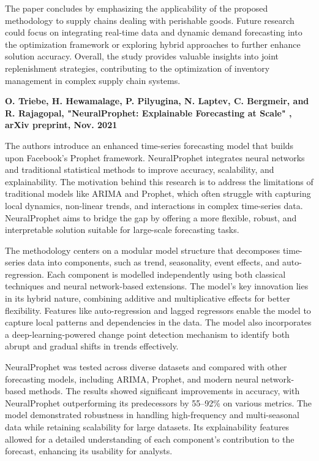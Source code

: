 The paper concludes by emphasizing the applicability of the proposed methodology to supply chains dealing with perishable goods. Future research could focus on integrating real-time data and dynamic demand forecasting into the optimization framework or exploring hybrid approaches to further enhance solution accuracy. Overall, the study provides valuable insights into joint replenishment strategies, contributing to the optimization of inventory management in complex supply chain systems.

\textbf{\cite{triebe2021neuralprophet}O. Triebe, H. Hewamalage, P. Pilyugina, N. Laptev, C. Bergmeir, and R. Rajagopal, "NeuralProphet: Explainable Forecasting at Scale" , arXiv preprint, Nov. 2021}


The authors introduce an enhanced time-series forecasting model that builds upon Facebook’s Prophet framework. NeuralProphet integrates neural networks and traditional statistical methods to improve accuracy, scalability, and explainability. The motivation behind this research is to address the limitations of traditional models like ARIMA and Prophet, which often struggle with capturing local dynamics, non-linear trends, and interactions in complex time-series data. NeuralProphet aims to bridge the gap by offering a more flexible, robust, and interpretable solution suitable for large-scale forecasting tasks.

The methodology centers on a modular model structure that decomposes time-series data into components, such as trend, seasonality, event effects, and auto-regression. Each component is modelled independently using both classical techniques and neural network-based extensions. The model’s key innovation lies in its hybrid nature, combining additive and multiplicative effects for better flexibility. Features like auto-regression and lagged regressors enable the model to capture local patterns and dependencies in the data. The model also incorporates a deep-learning-powered change point detection mechanism to identify both abrupt and gradual shifts in trends effectively.

NeuralProphet was tested across diverse datasets and compared with other forecasting models, including ARIMA, Prophet, and modern neural network-based methods. The results showed significant improvements in accuracy, with NeuralProphet outperforming its predecessors by 55–92\% on various metrics. The model demonstrated robustness in handling high-frequency and multi-seasonal data while retaining scalability for large datasets. Its explainability features allowed for a detailed understanding of each component’s contribution to the forecast, enhancing its usability for analysts.

